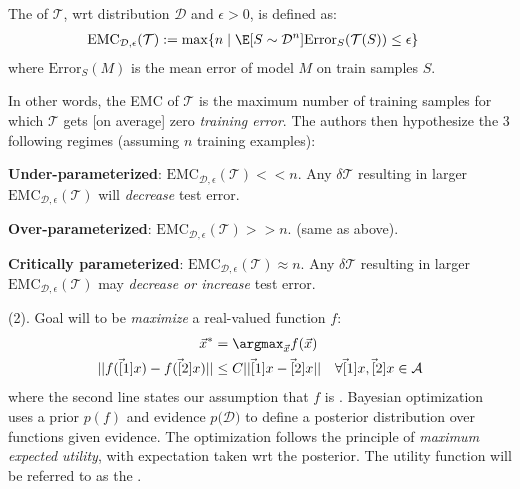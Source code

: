 \documentclass[11pt]{article}
\begin{document}
\begin{definition}
	The  of $\mathcal T$, wrt distribution $\mathcal D$ and $\epsilon > 0$, is defined as:
	\begin{align}
	\mathrm{EMC}_{\mathcal D, \epsilon}(\mathcal T) 
	&:= \max\{   n \mid \E[S \sim \mathcal{D}^n]{\mathrm{Error}_S(\mathcal T (S))  } \le \epsilon \}
	\end{align}
	where $\mathrm{Error}_S(M)$ is the mean error of model $M$ on train samples $S$.
\end{definition}
In other words, the EMC of $\mathcal T$ is the maximum number of training samples for which $\mathcal T$ gets [on average] zero \textit{training error}. The authors then hypothesize the 3 following regimes (assuming $n$ training examples):

\newcommand{\emc}{\mathrm{EMC}_{\mathcal D, \epsilon}(\mathcal T)}
\begin{compactitem}
	\item \textbf{Under-parameterized}: $\emc << n$. Any $\delta \mathcal T$ resulting in larger $\emc$ will \textit{decrease} test error.
	
	\item \textbf{Over-parameterized}: $\emc >> n$. (same as above).
	
	\item \textbf{Critically parameterized}: $\emc \approx n$. Any $\delta \mathcal T$ resulting in larger $\emc$ may \textit{decrease or increase} test error.
\end{compactitem}









 (2). Goal will to be \textit{maximize} a real-valued function $f$:
\begin{align}
	\vec{x}^* 
		&= \argmax_{\vec x} f(\vec x) \\
	|| f(\vec[1]{x}) - f( \vec[2]{x}  ) || 
		&\le C || \vec[1]{x} - \vec[2]{x} ||
		\quad \forall \vec[1]{x}, \vec[2]{x} \in \mathcal A
\end{align}
where the second line states our assumption that $f$ is . Bayesian optimization uses a prior $p(f)$ and evidence $p(\mathcal{D)}$ to define a posterior distribution over functions given evidence. The optimization follows the principle of \textit{maximum expected utility}, with expectation taken wrt the posterior. The utility function will be referred to as the . 
\end{document}
